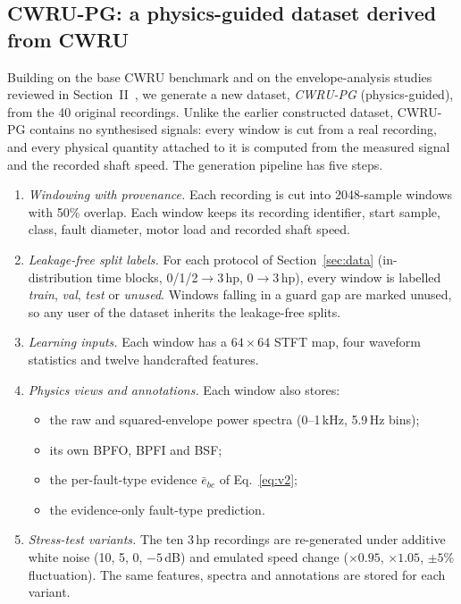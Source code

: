 \documentclass[conference]{IEEEtran}
\begin{document}
\subsection{CWRU-PG: a physics-guided dataset derived from CWRU}
\label{sec:cwrupg}
Building on the base CWRU benchmark and on the envelope-analysis studies
reviewed in Section~II~\cite{smith2015,randall2011}, we generate a new dataset,
\emph{CWRU-PG} (physics-guided), from the 40 original recordings. Unlike the
earlier constructed dataset, CWRU-PG contains no synthesised signals: every
window is cut from a real recording, and every physical quantity attached to
it is computed from the measured signal and the recorded shaft speed. The
generation pipeline has five steps.
\begin{enumerate}
\item \emph{Windowing with provenance.} Each recording is cut into 2048-sample
windows with 50\% overlap. Each window keeps its recording identifier, start
sample, class, fault diameter, motor load and recorded shaft speed.
\item \emph{Leakage-free split labels.} For each protocol of
Section~\ref{sec:data} (in-distribution time blocks, 0/1/2$\to$3\,hp,
0$\to$3\,hp), every window is labelled \emph{train}, \emph{val}, \emph{test} or
\emph{unused}. Windows falling in a guard gap are marked unused, so any
user of the dataset inherits the leakage-free splits.
\item \emph{Learning inputs.} Each window has a $64\times64$ STFT map, four
waveform statistics and twelve handcrafted features.
\item \emph{Physics views and annotations.} Each window also stores:
\begin{itemize}
\item the raw and squared-envelope power spectra (0--1\,kHz, 5.9\,Hz bins);
\item its own BPFO, BPFI and BSF;
\item the per-fault-type evidence $\bar e_{bc}$ of Eq.~\eqref{eq:v2};
\item the evidence-only fault-type prediction.
\end{itemize}
\item \emph{Stress-test variants.} The ten 3\,hp recordings are re-generated
under additive white noise (10, 5, 0, $-5$\,dB) and emulated speed change
($\times0.95$, $\times1.05$, $\pm5\%$ fluctuation). The same features, spectra
and annotations are stored for each variant.
\end{enumerate}
\end{document}
